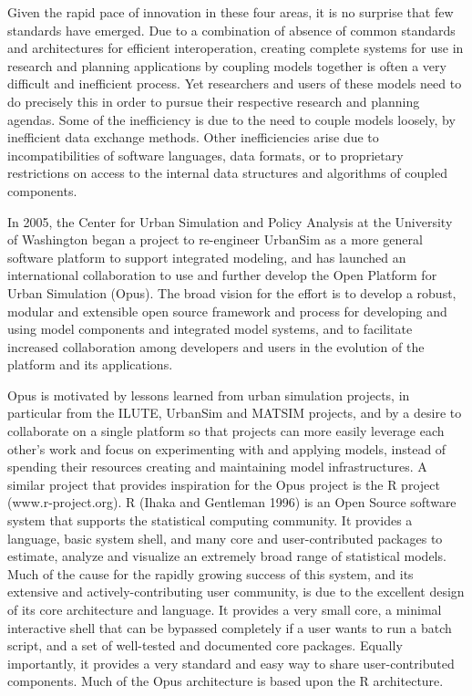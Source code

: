 Given the rapid pace of innovation in these four areas, it is no surprise that few standards have emerged.  Due to a combination of absence of common standards and architectures for efficient interoperation, creating complete systems for use in research and planning applications by coupling models together is often a very difficult and inefficient process.  Yet researchers and users of these models need to do precisely this in order to pursue their respective research and planning agendas.  Some of the inefficiency is due to the need to couple models loosely, by inefficient data exchange methods. Other inefficiencies arise due to incompatibilities of software languages, data formats, or to proprietary restrictions on access to the internal data structures and algorithms of coupled components. 

In 2005, the Center for Urban Simulation and Policy Analysis at the University of Washington began a project to re-engineer UrbanSim as a more general software platform to support
integrated modeling, and has launched an international collaboration to use and further develop the Open Platform for Urban Simulation (Opus).  The broad vision for the effort is to develop a robust, modular and extensible open source framework and process for developing and using model components and integrated model systems, and to facilitate increased collaboration among developers and users in the evolution of the platform and its applications.  

Opus is motivated by lessons learned from urban simulation projects, in particular from the ILUTE, UrbanSim and MATSIM projects, and by a desire to collaborate on a single platform so that projects can more easily leverage each other's work and focus on experimenting with and applying models, instead of spending their resources creating and maintaining model infrastructures.  
A similar project that provides inspiration for the Opus project is the R project (www.r-project.org).  R (Ihaka and Gentleman 1996) is an Open Source software system that supports the statistical computing community.  It provides a language, basic system shell, and many core and user-contributed packages to estimate, analyze and visualize an extremely broad range of statistical models.  Much of the cause for the rapidly growing success of this system, and its extensive and actively-contributing user community, is due to the excellent design of its core architecture and language.  It provides a very small core, a minimal interactive shell that can be bypassed completely if a user wants to run a batch script, and a set of well-tested and documented core packages.  Equally importantly, it provides a very standard and easy way to share user-contributed components.  Much of the Opus architecture is based upon the R architecture.


